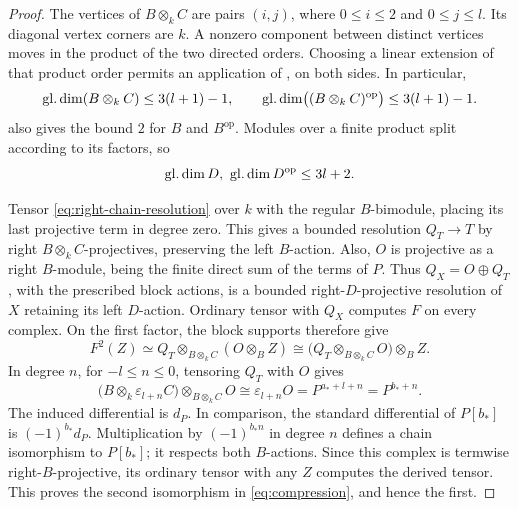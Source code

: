 \begin{proof}
The vertices of \(B\otimes_k C\) are pairs \((i,j)\), where
\(0\le i\le2\) and \(0\le j\le l\).  Its diagonal vertex
corners are \(k\).  A nonzero component between distinct
vertices moves in the product of the two directed orders.
Choosing a linear extension of that product order permits
an application of , on both sides.
In particular,
\[
\operatorname{gl.dim}(B\otimes_k C)\le3(l+1)-1,
\qquad
\operatorname{gl.dim}\bigl((B\otimes_k C)^{\mathrm{op}}\bigr)
\le3(l+1)-1.
\]
 also gives the bound \(2\) for \(B\) and
\(B^{\mathrm{op}}\).  Modules over a finite product split
according to its factors, so
\[
\operatorname{gl.dim} D,\ \operatorname{gl.dim} D^{\mathrm{op}}\le3l+2.
\]

Tensor \eqref{eq:right-chain-resolution} over \(k\) with
the regular \(B\)-bimodule, placing its last projective term
in degree zero.  This gives a bounded resolution \(Q_T\to T\)
by right \(B\otimes_k C\)-projectives, preserving the left
\(B\)-action.  Also, \(O\) is projective as a right
\(B\)-module, being the finite direct sum of the terms of \(P\).
Thus \(Q_X=O\oplus Q_T\), with the prescribed block actions,
is a bounded right-\(D\)-projective resolution of \(X\) retaining
its left \(D\)-action.  Ordinary tensor with \(Q_X\) computes
\(F\) on every complex.  On the first factor, the block supports
therefore give
\[
F^2(Z)\simeq
Q_T\otimes_{B\otimes_k C}(O\otimes_B Z)
\cong
\bigl(Q_T\otimes_{B\otimes_k C}O\bigr)\otimes_B Z.
\]
In degree \(n\), for \(-l\le n\le0\), tensoring \(Q_T\)
with \(O\) gives
\[
\bigl(B\otimes_k\varepsilon_{l+n}C\bigr)
\otimes_{B\otimes_k C}O
\cong\varepsilon_{l+n}O
=P^{a_*+l+n}=P^{b_*+n}.
\]
The induced differential is \(d_P\).
In comparison, the standard differential of \(P[b_*]\) is
\((-1)^{b_*}d_P\).  Multiplication by
\((-1)^{b_*n}\) in degree \(n\) defines a chain isomorphism
to \(P[b_*]\); it respects both \(B\)-actions.
Since this complex is termwise right-\(B\)-projective, its
ordinary tensor with any \(Z\) computes the derived tensor.
This proves the second isomorphism in
\eqref{eq:compression}, and hence the first.
\end{proof}
